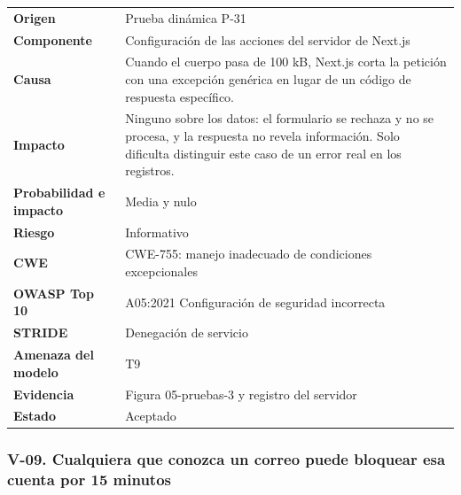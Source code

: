 \documentclass[12pt, letterpaper]{article}
\begin{document}
\begingroup\small\setlength{\tabcolsep}{4pt}\renewcommand{\arraystretch}{1.25}
\begin{longtable}{L{0.24}L{0.70}}
\toprule
\endfirsthead
\toprule
\endhead
\bottomrule
\endfoot
\textbf{Origen} & Prueba dinámica P-31 \\
\textbf{Componente} & Configuración de las acciones del servidor de Next.js \\
\textbf{Causa} & Cuando el cuerpo pasa de 100 kB, Next.js corta la petición con una excepción genérica en lugar de un código de respuesta específico. \\
\textbf{Impacto} & Ninguno sobre los datos: el formulario se rechaza y no se procesa, y la respuesta no revela información. Solo dificulta distinguir este caso de un error real en los registros. \\
\textbf{Probabilidad e impacto} & Media y nulo \\
\textbf{Riesgo} & Informativo \\
\textbf{CWE} & CWE-755: manejo inadecuado de condiciones excepcionales \\
\textbf{OWASP Top 10} & A05:2021 Configuración de seguridad incorrecta \\
\textbf{STRIDE} & Denegación de servicio \\
\textbf{Amenaza del modelo} & T9 \\
\textbf{Evidencia} & Figura 05-pruebas-3 y registro del servidor \\
\textbf{Estado} & Aceptado \\
\end{longtable}
\endgroup

\subsubsection*{V-09. Cualquiera que conozca un correo puede bloquear esa cuenta por 15 minutos}
\end{document}
